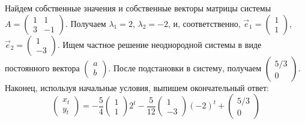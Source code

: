 \begin{solution}
Найдем собственные значения и собственные векторы матрицы системы  
$A=\begin{pmatrix}
1 & 1 \\
3 & -1 
\end{pmatrix}$. Получаем  $\lambda_1=2$, $\lambda_2=-2$, и, соответственно,  
$\vec{e}_1=\begin{pmatrix}
1 \\
1
\end{pmatrix}$,
$\vec{e}_2=\begin{pmatrix}
1 \\
-3
\end{pmatrix}$. Ищем частное решение неоднородной системы в виде постоянного вектора   
$\begin{pmatrix}
a \\
b
\end{pmatrix}$. 
После подстановки в систему, получаем  
$\begin{pmatrix}
5/3 \\
0
\end{pmatrix}$. 
Наконец, используя начальные условия, выпишем окончательный ответ:
\[
\begin{pmatrix}
x_t \\
y_t
\end{pmatrix} =
-\frac{5}{4}
\begin{pmatrix}
1 \\
1
\end{pmatrix} 
2^t
-\frac{5}{12}
\begin{pmatrix}
1 \\
-3
\end{pmatrix} 
(-2)^t
+\begin{pmatrix}
5/3 \\
0
\end{pmatrix}
\]
\begin{comment} %

\end{comment}
\end{solution}
